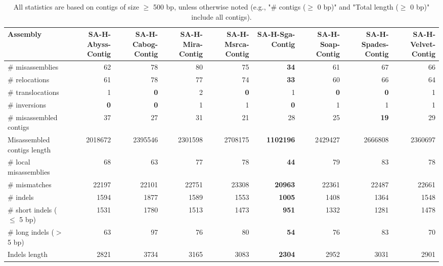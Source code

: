 \documentclass[12pt,a4paper]{article}
\begin{document}
\begin{table}[ht]
\begin{center}
\caption{All statistics are based on contigs of size $\geq$ 500 bp, unless otherwise noted (e.g., "\# contigs ($\geq$ 0 bp)" and "Total length ($\geq$ 0 bp)" include all contigs).}
\begin{tabular}{|l*{8}{|r}|}
\hline
Assembly & SA-H-Abyss-Contig & SA-H-Cabog-Contig & SA-H-Mira-Contig & SA-H-Msrca-Contig & SA-H-Sga-Contig & SA-H-Soap-Contig & SA-H-Spades-Contig & SA-H-Velvet-Contig \\ \hline
\# misassemblies & 62 & 78 & 80 & 75 & {\bf 34} & 61 & 67 & 66 \\ \hline
\hspace{5mm}\# relocations & 61 & 78 & 77 & 74 & {\bf 33} & 60 & 66 & 64 \\ \hline
\hspace{5mm}\# translocations & 1 & {\bf 0} & 2 & {\bf 0} & 1 & {\bf 0} & {\bf 0} & 1 \\ \hline
\hspace{5mm}\# inversions & {\bf 0} & {\bf 0} & 1 & 1 & {\bf 0} & 1 & 1 & 1 \\ \hline
\# misassembled contigs & 37 & 27 & 31 & 21 & 28 & 25 & {\bf 19} & 29 \\ \hline
Misassembled contigs length & 2018672 & 2395546 & 2301598 & 2708175 & {\bf 1102196} & 2429427 & 2666808 & 2360697 \\ \hline
\# local misassemblies & 68 & 63 & 77 & 78 & {\bf 44} & 79 & 83 & 78 \\ \hline
\# mismatches & 22197 & 22101 & 22751 & 23308 & {\bf 20963} & 22361 & 22487 & 22661 \\ \hline
\# indels & 1594 & 1877 & 1589 & 1553 & {\bf 1005} & 1408 & 1364 & 1548 \\ \hline
\hspace{5mm}\# short indels ($\leq$ 5 bp) & 1531 & 1780 & 1513 & 1473 & {\bf 951} & 1332 & 1281 & 1478 \\ \hline
\hspace{5mm}\# long indels ($>$ 5 bp) & 63 & 97 & 76 & 80 & {\bf 54} & 76 & 83 & 70 \\ \hline
Indels length & 2821 & 3734 & 3165 & 3083 & {\bf 2304} & 2952 & 3031 & 2901 \\ \hline
\end{tabular}
\end{center}
\end{table}
\end{document}
